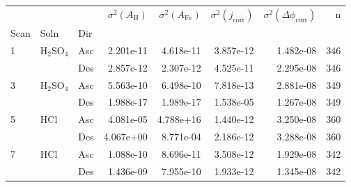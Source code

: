 \begin{tabular}{lllrrrrr}
\toprule
  &     &     &  $\sigma^2(A_{\text{H}})$ &  $\sigma^2(A_{\text{Fe}})$ &  $\sigma^2(j_{\text{corr}})$ &  $\sigma^2(\Delta \phi_{\text{corr}})$ &    n \\
Scan & Soln & Dir &                           &                            &                              &                                        &      \\
\midrule
1 & H$_2$SO$_4$ & Asc &                 2.201e-11 &                  4.618e-11 &                    3.857e-12 &                              1.482e-08 &  346 \\
  &     & Des &                 2.857e-12 &                  2.307e-12 &                    4.525e-11 &                              2.295e-08 &  346 \\
3 & H$_2$SO$_4$ & Asc &                 5.563e-10 &                  6.498e-10 &                    7.818e-13 &                              2.881e-08 &  349 \\
  &     & Des &                 1.988e-17 &                  1.989e-17 &                    1.538e-05 &                              1.267e-08 &  349 \\
5 & HCl & Asc &                 4.081e-05 &                  4.788e+16 &                    1.440e-12 &                              3.250e-08 &  360 \\
  &     & Des &                 4.067e+00 &                  8.771e-04 &                    2.186e-12 &                              3.288e-08 &  360 \\
7 & HCl & Asc &                 1.088e-10 &                  8.696e-11 &                    3.508e-12 &                              1.929e-08 &  342 \\
  &     & Des &                 1.436e-09 &                  7.955e-10 &                    1.933e-12 &                              1.345e-08 &  342 \\
\bottomrule
\end{tabular}
